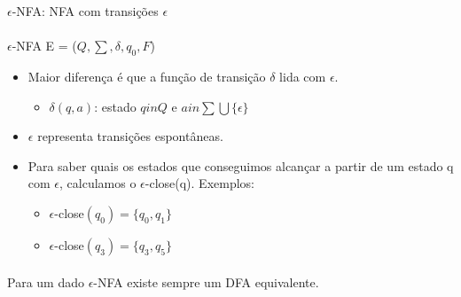 \documentclass[../resumosTCOM.tex]{subfiles}
\begin{document}
 

$\epsilon$-NFA: NFA com transições \(\epsilon\)

\paragraph{}

$\epsilon$-NFA E = (\(Q, \sum, \delta, q_0, F\))
\begin{itemize}
    \item Maior diferença é que a função de transição \(\delta\) lida com \(\epsilon\).
    \begin{itemize}
        \item \(\delta(q, a)\): estado \(q in Q\) e \(a in \sum \bigcup \{\epsilon\}\)
    \end{itemize}
    \item \(\epsilon\) representa transições espontâneas.
    \item Para saber quais os estados que conseguimos alcançar a partir de um estado q com \(\epsilon\), calculamos o $\epsilon$-close(q). Exemplos:
    \begin{itemize}
        \item $\epsilon$-close\((q_0) = \{q_0, q_1\}\)
        \item $\epsilon$-close\((q_3) = \{q_3, q_5\}\)
    \end{itemize}
\end{itemize}

\paragraph{}

Para um dado $\epsilon$-NFA existe sempre um DFA equivalente.
\end{document}
